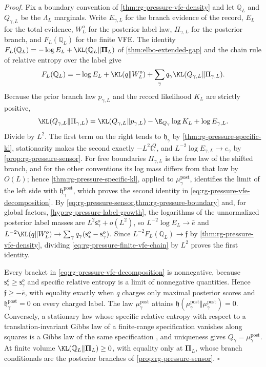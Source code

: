 \noindent\emph{Proof.}
Fix a boundary convention of \cref{thm:rg-pressure-vfe-density} and let
$\mathbb Q_L$ and $Q_{\gamma,L}$ be the $\Lambda_L$ marginals. Write
$E_{\gamma,L}$ for the branch evidence of the record, $E_L$ for the total
evidence, $W^o_L$ for the posterior label law, $\Pi_{\gamma,L}$ for the
posterior branch, and $F_L(\mathbb Q_L)$ for the finite VFE. The identity
$F_L(\mathbb Q_L)=-\log E_L+\KL(\mathbb Q_L\Vert\boldsymbol\Pi_L)$ of
\cref{thm:elbo-extended-gap} and the chain rule of relative entropy over the
label give
\begin{equation}
 F_L(\mathbb Q_L)=-\log E_L+\KL(q\Vert W^o_L)
 +\sum_\gamma q_\gamma\KL(Q_{\gamma,L}\Vert\Pi_{\gamma,L}).
 \label{eq:rg-pressure-finite-vfe-chain}
\end{equation}
Because the prior branch law $p_{\gamma,L}$ and the record likelihood
$K_L$ are strictly positive,
\begin{equation}
 \KL(Q_{\gamma,L}\Vert\Pi_{\gamma,L})=\KL(Q_{\gamma,L}\Vert p_{\gamma,L})
 -\E_{Q_\gamma}\log K_L+\log E_{\gamma,L}.
 \label{eq:rg-pressure-finite-branch-posterior}
\end{equation}
Divide by $L^2$. The first term on the right tends to $\mathfrak h_\gamma$ by
\cref{thm:rg-pressure-specific-kl}, stationarity makes the second exactly
$-L^2\mathfrak l^Q_\gamma$, and $L^{-2}\log E_{\gamma,L}\to e_\gamma$ by
\cref{prop:rg-pressure-sensor}. For free boundaries $\Pi_{\gamma,L}$ is the
free law of the shifted branch, and for the other conventions its log mass
differs from that law by $O(L)$; hence \cref{thm:rg-pressure-specific-kl},
applied to $\mu^{\mathrm{post}}_\gamma$, identifies the limit of the left side
with $\mathfrak h^{\mathrm{post}}_\gamma$, which proves the second identity in
\cref{eq:rg-pressure-vfe-decomposition}. By
\cref{eq:rg-pressure-sensor,thm:rg-pressure-boundary} and, for global factors,
\cref{hyp:rg-pressure-label-growth}, the logarithms of the unnormalized
posterior label masses are $L^2\mathsf s^o_\gamma+o(L^2)$, so
$L^{-2}\log E_L\to\bar e$ and
$L^{-2}\KL(q\Vert W^o_L)\to\sum_\gamma q_\gamma(\mathsf s^o_*-\mathsf s^o_\gamma)$.
Since $L^{-2}F_L(\mathbb Q_L)\to\mathfrak f$ by
\cref{thm:rg-pressure-vfe-density}, dividing
\cref{eq:rg-pressure-finite-vfe-chain} by $L^2$ proves the first identity.

Every bracket in \cref{eq:rg-pressure-vfe-decomposition} is nonnegative,
because $\mathsf s^o_*\geq\mathsf s^o_\gamma$ and specific relative entropy is
a limit of nonnegative quantities. Hence $\mathfrak f\geq-\bar e$, with equality
exactly when $q$ charges only maximal posterior scores and
$\mathfrak h^{\mathrm{post}}_\gamma=0$ on every charged label. The law
$\mu^{\mathrm{post}}_\gamma$ attains
$\mathfrak h(\mu^{\mathrm{post}}_\gamma\Vert\mu^{\mathrm{post}}_\gamma)=0$.
Conversely, a stationary law whose specific relative entropy with respect to
a translation-invariant Gibbs law of a finite-range specification vanishes
along squares is a Gibbs law of the same specification
\citep[Thm.~15.37]{Georgii1988}, and uniqueness gives
$Q_\gamma=\mu^{\mathrm{post}}_\gamma$. At finite volume
$\KL(\mathbb Q_L\Vert\boldsymbol\Pi_L)\geq0$, with equality only at
$\boldsymbol\Pi_L$, whose branch conditionals are the posterior branches of
\cref{prop:rg-pressure-sensor}. $\square$

